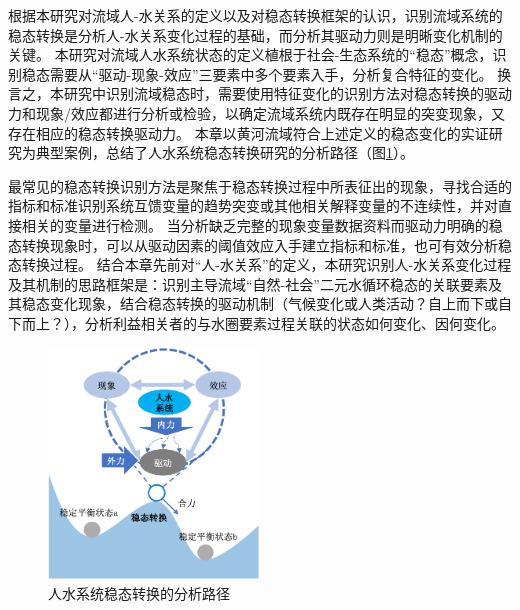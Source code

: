 根据本研究对流域人-水关系的定义以及对稳态转换框架的认识，识别流域系统的稳态转换是分析人-水关系变化过程的基础，而分析其驱动力则是明晰变化机制的关键。
本研究对流域人水系统状态的定义植根于社会-生态系统的“稳态”概念，识别稳态需要从“驱动-现象-效应”三要素中多个要素入手，分析复合特征的变化。
换言之，本研究中识别流域稳态时，需要使用特征变化的识别方法对稳态转换的驱动力和现象/效应都进行分析或检验，以确定流域系统内既存在明显的突变现象，又存在相应的稳态转换驱动力。
本章以黄河流域符合上述定义的稳态变化的实证研究为典型案例，总结了人水系统稳态转换研究的分析路径（图\ref{ch2:fig:identifying}）。

最常见的稳态转换识别方法是聚焦于稳态转换过程中所表征出的现象，寻找合适的指标和标准识别系统互馈变量的趋势突变或其他相关解释变量的不连续性，并对直接相关的变量进行检测。
当分析缺乏完整的现象变量数据资料而驱动力明确的稳态转换现象时，可以从驱动因素的阈值效应入手建立指标和标准，也可有效分析稳态转换过程。
结合本章先前对“人-水关系”的定义，本研究识别人-水关系变化过程及其机制的思路框架是：识别主导流域“自然-社会”二元水循环稳态的关联要素及其稳态变化现象，结合稳态转换的驱动机制（气候变化或人类活动？自上而下或自下而上？），分析利益相关者的与水圈要素过程关联的状态如何变化、因何变化。

\begin{figure}[!htb] %
    \centering
    \includegraphics[width=0.5\textwidth]{img/ch2/ch2_framework.png}
    \caption{人水系统稳态转换的分析路径}\label{ch2:fig:identifying}
\end{figure}
